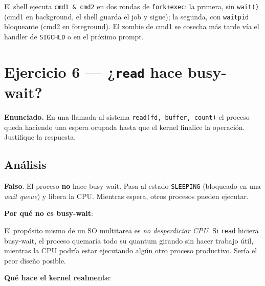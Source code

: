 \documentclass[11pt,a4paper]{article}
\begin{document}
\begin{respuesta}
El shell ejecuta \texttt{cmd1 \& cmd2} en dos rondas de
\texttt{fork+exec}: la primera, sin \texttt{wait()} (cmd1 en
background, el shell guarda el job y sigue); la segunda, con
\texttt{waitpid} bloqueante (cmd2 en foreground). El zombie de
cmd1 se cosecha más tarde vía el handler de \texttt{SIGCHLD} o en
el próximo prompt.
\end{respuesta}

\section{Ejercicio 6 --- ¿\texttt{read} hace busy-wait?}

\textbf{Enunciado.} En una llamada al sistema \texttt{read(fd,
buffer, count)} el proceso queda haciendo una espera ocupada hasta
que el kernel finalice la operación. Justifique la respuesta.

\subsection*{Análisis}

\begin{respuesta}
\textbf{Falso}. El proceso \textbf{no} hace busy-wait. Pasa al
estado \texttt{SLEEPING} (bloqueado en una \emph{wait queue}) y
libera la CPU. Mientras espera, otros procesos pueden ejecutar.
\end{respuesta}

\textbf{Por qué no es busy-wait}:

El propósito mismo de un SO multitarea es \emph{no desperdiciar CPU}.
Si \texttt{read} hiciera busy-wait, el proceso quemaría todo su
quantum girando sin hacer trabajo útil, mientras la CPU podría
estar ejecutando algún otro proceso productivo. Sería el peor diseño
posible.

\textbf{Qué hace el kernel realmente}:
\end{document}
